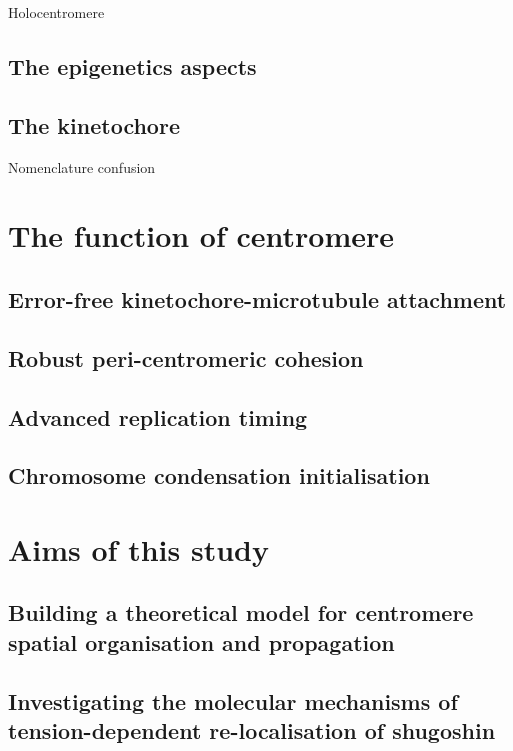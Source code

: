 Holocentromere


\subsection{The epigenetics aspects}
\subsection{The kinetochore}

Nomenclature confusion

\section{The function of centromere}
\subsection{Error-free kinetochore-microtubule attachment}
\subsection{Robust peri-centromeric cohesion}
\subsection{Advanced replication timing}
\subsection{Chromosome condensation initialisation}
\section{Aims of this study}
\subsection{Building a theoretical model for centromere spatial organisation and propagation}
\subsection{Investigating the molecular mechanisms of tension-dependent re-localisation of shugoshin}
